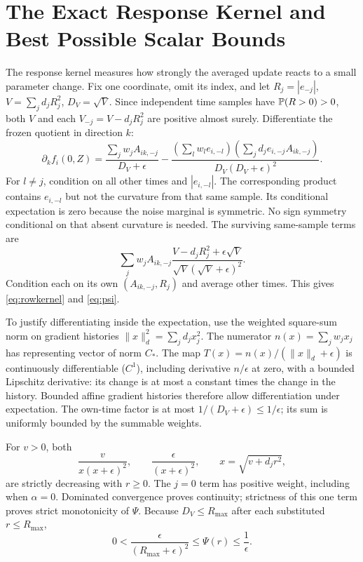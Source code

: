 \section{The Exact Response Kernel and Best Possible Scalar Bounds}\label{app:kernel}

The response kernel measures how strongly the averaged update reacts to a
small parameter change. Fix one coordinate, omit its index, and let $R_j=|e_{-j}|$,
$V=\sum_jd_jR_j^2$, $D_V=\sqrt V$. Since independent time samples have
$\mathbb P(R>0)>0$, both $V$ and each $V_{-j}=V-d_jR_j^2$ are positive
almost surely. Differentiate the frozen quotient in direction $k$:
\[
 \partial_kf_i(0,Z)=
 \frac{\sum_jw_jA_{ik,-j}}{D_V+\epsilon}
 -\frac{(\sum_lw_le_{i,-l})(\sum_jd_je_{i,-j}A_{ik,-j})}
 {D_V(D_V+\epsilon)^2}.
\]
For $l\ne j$, condition on all other times and $|e_{i,-l}|$. The
corresponding product contains $e_{i,-l}$ but not the curvature from that
same sample. Its conditional expectation is zero because the noise
marginal is symmetric. No sign symmetry conditional on that absent
curvature is needed. The surviving same-sample terms are
\[
 \sum_j w_j A_{ik,-j}
 \frac{V-d_jR_j^2+\epsilon\sqrt V}{\sqrt V(\sqrt V+\epsilon)^2}.
\]
Condition each on its own $(A_{ik,-j},R_j)$ and average other times.
This gives \eqref{eq:rowkernel} and \eqref{eq:psi}.

To justify differentiating inside the expectation, use the weighted
square-sum norm on gradient histories $\|x\|_d^2=\sum_jd_jx_j^2$. The numerator
$n(x)=\sum_jw_jx_j$ has representing vector of norm $C_*$. The map
$T(x)=n(x)/(\|x\|_d+\epsilon)$ is continuously differentiable ($C^1$), including derivative
$n/\epsilon$ at zero, with a bounded Lipschitz derivative: its change is at
most a constant times the change in the history. Bounded affine gradient histories
therefore allow differentiation under expectation.
The own-time factor is at most $1/(D_V+\epsilon)\leq1/\epsilon$;
its sum is uniformly bounded by the summable weights.

For $v>0$, both
\[
 \frac{v}{x(x+\epsilon)^2},\qquad
 \frac{\epsilon}{(x+\epsilon)^2},\qquad x=\sqrt{v+d_jr^2},
\]
are strictly decreasing with $r\geq0$. The $j=0$ term has positive
weight, including when $\alpha=0$. Dominated convergence proves continuity;
strictness of this one term proves strict monotonicity of $\Psi$.
Because $D_V\leq R_{\max}$ after each substituted $r\leq R_{\max}$,
\[
 0<\frac{\epsilon}{(R_{\max}+\epsilon)^2}
       \leq\Psi(r)\leq\frac1\epsilon.
\]

